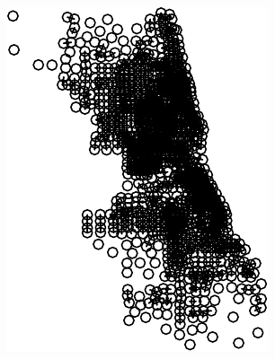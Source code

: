 \documentclass[
  shownotes,
  xcolor={svgnames},
  hyperref={colorlinks,citecolor=DarkBlue,linkcolor=DarkRed,urlcolor=DarkBlue}
  ]{beamer}
\begin{document}
\begin{frame}[fragile]
 \begin{figure}[H] \centering
    \captionsetup{justification=centering}
    \includegraphics[scale=0.7]{Example_12_files/figure-latex/unnamed-chunk-3-1.pdf}
   \end{figure}



\end{frame}
\end{document}
